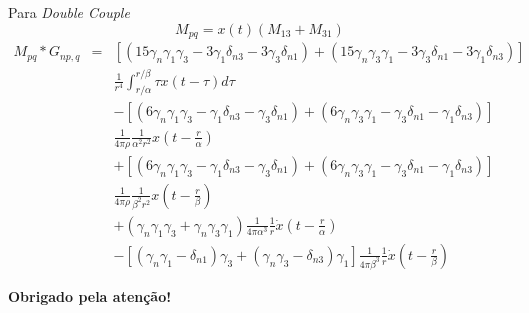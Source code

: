 \documentclass{beamer}
\begin{document}
\begin{frame}{Para \textit{Double Couple}}
	\small
	$$M_{pq} = x(t) (M_{13}+M_{31}) $$
\begin{eqnarray}
M_{pq} \ast G_{np,q} &=&[(15\gamma_n\gamma_1\gamma_3-3\gamma_1\delta_{n3}-3\gamma_3\delta_{n1})+(15\gamma_n\gamma_3\gamma_1-3\gamma_3\delta_{n1}-3\gamma_1\delta_{n3})] \nonumber \\
&&\frac{1}{r^4}\int_{r/\alpha}^{r/\beta} \tau x(t-\tau) d\tau \nonumber\\
&&-[(6\gamma_n\gamma_1\gamma_3-\gamma_1\delta_{n3}-\gamma_3\delta_{n1})+(6\gamma_n\gamma_3\gamma_1-\gamma_3\delta_{n1}-\gamma_1\delta_{n3})]  \nonumber \\
&& \frac{1}{4\pi\rho}\frac{1}{\alpha ^2r^2}x\left(t-\frac{r}{\alpha}\right) \nonumber \\
&&+[(6\gamma_n\gamma_1\gamma_3-\gamma_1\delta_{n3}-\gamma_3\delta_{n1})+(6\gamma_n\gamma_3\gamma_1-\gamma_3\delta_{n1}-\gamma_1\delta_{n3})]  \nonumber \\
&& \frac{1}{4\pi\rho}\frac{1}{\beta ^2r^2}x\left(t-\frac{r}{\beta}\right) \nonumber \\
&&+(\gamma_n\gamma_1\gamma_3+\gamma_n\gamma_3\gamma_1)\frac{1}{4\pi\alpha^3}\frac{1}{r}\dot{x}\left(t-\frac{r}{\alpha}\right) \nonumber \\
&&-[(\gamma_n\gamma_1-\delta_{n1})\gamma_3+(\gamma_n\gamma_3-\delta_{n3})\gamma_1]\frac{1}{4\pi\beta^3}\frac{1}{r}\dot{x}\left(t-\frac{r}{\beta}\right) \nonumber
\end{eqnarray}

\end{frame}

\begin{frame}
	\begin{center}
		\textbf{{\large Obrigado pela atenção!}}
	\end{center}
	
\end{frame}
\end{document}

